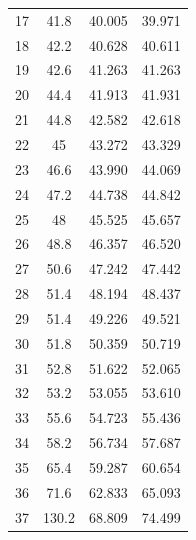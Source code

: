 \begin{table}[H]
\begin{tabular}{cccc}
    17         & 41.8                        & 40.005                & 39.971                 \\
    18         & 42.2                        & 40.628                & 40.611                 \\
    19         & 42.6                        & 41.263                & 41.263                 \\
    20         & 44.4                        & 41.913                & 41.931                 \\
    21         & 44.8                        & 42.582                & 42.618                 \\
    22         & 45                          & 43.272                & 43.329                 \\
    23         & 46.6                        & 43.990                & 44.069                 \\
    24         & 47.2                        & 44.738                & 44.842                 \\
    25         & 48                          & 45.525                & 45.657                 \\
    26         & 48.8                        & 46.357                & 46.520                 \\
    27         & 50.6                        & 47.242                & 47.442                 \\
    28         & 51.4                        & 48.194                & 48.437                 \\
    29         & 51.4                        & 49.226                & 49.521                 \\
    30         & 51.8                        & 50.359                & 50.719                 \\
    31         & 52.8                        & 51.622                & 52.065                 \\
    32         & 53.2                        & 53.055                & 53.610                 \\
    33         & 55.6                        & 54.723                & 55.436                 \\
    34         & 58.2                        & 56.734                & 57.687                 \\
    35         & 65.4                        & 59.287                & 60.654                 \\
    36         & 71.6                        & 62.833                & 65.093                 \\
    37         & 130.2                       & 68.809                & 74.499       \\
    \bottomrule         
    \end{tabular}
    \end{table}

